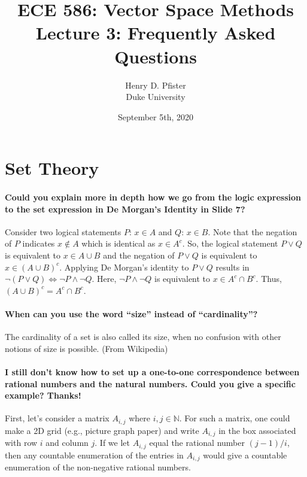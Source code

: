\documentclass[10pt,english]{article}
\begin{document}
\title{ECE 586: Vector Space Methods \\ Lecture 3: Frequently Asked Questions}
\author{Henry D. Pfister \\ Duke University}
\date{September 5th, 2020}

\maketitle


\section{Set Theory}

\paragraph{Could you explain more in depth how we go from the logic expression to the set expression in De Morgan's Identity in Slide 7?}

Consider two logical statements $P$: $x \in A$ and $Q$: $x \in B$. Note that the negation of $P$ indicates $x \notin A$ which is identical as $x \in A^c$. So, the logical statement $P \vee Q$ is equivalent to $x \in A \cup B$ and the negation of $P \vee Q$ is equivalent to $x \in (A \cup B)^c$. Applying De Morgan's identity to $P \vee Q$ results in $\neg (P \vee Q) \Leftrightarrow \neg P \wedge \neg Q$. Here, $\neg P \wedge \neg Q$ is equivalent to $x \in A^c \cap B^c$. Thus, $(A \cup B)^c = A^c \cap B^c$.

\paragraph{When can you use the word ``size'' instead of ``cardinality''?}

The cardinality of a set is also called its size, when no confusion with other notions of size is possible. (From Wikipedia)

\paragraph{I still don't know how to set up a one-to-one correspondence between rational numbers and the natural numbers. Could you give a specific example? Thanks!}

First, let's consider a matrix $A_{i,j}$ where $i,j \in \mathbb{N}$.
For such a matrix, one could make a 2D grid (e.g., picture graph paper) and write $A_{i,j}$ in the box associated with row $i$ and column $j$.
If we let $A_{i,j}$ equal the rational number $(j-1)/i$, then any countable enumeration of the entries in $A_{i,j}$ would give a countable enumeration of the non-negative rational numbers.
\end{document}
